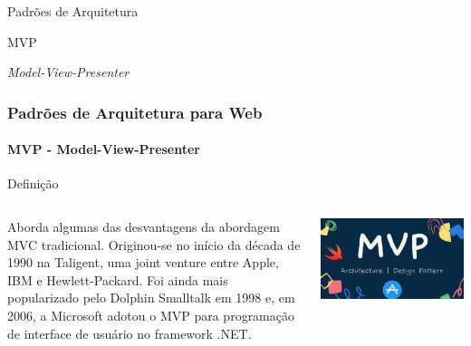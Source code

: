 \documentclass[
	9pt, %
	t, %
]{beamer}
\begin{document}
\begin{frame}
	\begin{center}
		
		\bigskip\bigskip\bigskip\bigskip %
		{\Large Padrões de Arquitetura}
		
		\bigskip\bigskip %
		{\Huge MVP}
		
		\smallskip
		{\small \textit{Model-View-Presenter}}
	\end{center}

\end{frame}

\begin{frame}
	\frametitle{Padrões de Arquitetura para Web}
	\framesubtitle{MVP - Model-View-Presenter}

	\begin{block}{Definição}
	\begin{columns}[c] %
			\begin{column}{0.8\textwidth} %
				Aborda algumas das desvantagens da abordagem MVC tradicional. Originou-se no início da década de 1990 na Taligent, uma joint venture entre Apple, IBM e Hewlett-Packard. Foi ainda mais popularizado pelo Dolphin Smalltalk em 1998 e, em 2006, a Microsoft adotou o MVP para programação de interface de usuário no framework .NET.
			\end{column}

			\begin{column}{0.2\textwidth} %
				\includegraphics[width=0.9\linewidth]{Images/mvp_logo.jpg}
			\end{column}
		\end{columns}
	\end{block}

\end{frame}
\end{document}
